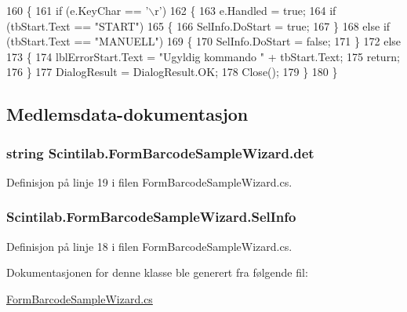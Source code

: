 \begin{DoxyCode}
160         \{
161             \textcolor{keywordflow}{if} (e.KeyChar == \textcolor{charliteral}{'\(\backslash\)r'})
162             \{
163                 e.Handled = \textcolor{keyword}{true};
164                 \textcolor{keywordflow}{if} (tbStart.Text == \textcolor{stringliteral}{"START"})
165                 \{
166                     SelInfo.DoStart = \textcolor{keyword}{true};
167                 \}
168                 \textcolor{keywordflow}{else} \textcolor{keywordflow}{if} (tbStart.Text == \textcolor{stringliteral}{"MANUELL"})
169                 \{
170                     SelInfo.DoStart = \textcolor{keyword}{false};
171                 \}
172                 \textcolor{keywordflow}{else}
173                 \{
174                     lblErrorStart.Text = \textcolor{stringliteral}{"Ugyldig kommando "} + tbStart.Text;
175                     \textcolor{keywordflow}{return};
176                 \}
177                 DialogResult = DialogResult.OK;
178                 Close();
179             \}
180         \}
\end{DoxyCode}


\subsection{Medlemsdata-\/dokumentasjon}
\hypertarget{class_scintilab_1_1_form_barcode_sample_wizard_a7b70de65be45e93c95b176887be00dd0}{
\subsubsection[{det}]{\setlength{\rightskip}{0pt plus 5cm}string Scintilab.\+Form\+Barcode\+Sample\+Wizard.\+det}}\label{class_scintilab_1_1_form_barcode_sample_wizard_a7b70de65be45e93c95b176887be00dd0}


Definisjon på linje 19 i filen Form\+Barcode\+Sample\+Wizard.\+cs.

\hypertarget{class_scintilab_1_1_form_barcode_sample_wizard_abaafc00e1f7078936d2ff912da04c9af}{
\subsubsection[{Sel\+Info}]{ Scintilab.\+Form\+Barcode\+Sample\+Wizard.\+Sel\+Info\hspace{0.3cm}{\ttfamily [private]}}}\label{class_scintilab_1_1_form_barcode_sample_wizard_abaafc00e1f7078936d2ff912da04c9af}


Definisjon på linje 18 i filen Form\+Barcode\+Sample\+Wizard.\+cs.



Dokumentasjonen for denne klasse ble generert fra følgende fil\+:\begin{DoxyCompactItemize}
\item 
\hyperlink{_form_barcode_sample_wizard_8cs}{Form\+Barcode\+Sample\+Wizard.\+cs}\end{DoxyCompactItemize}
